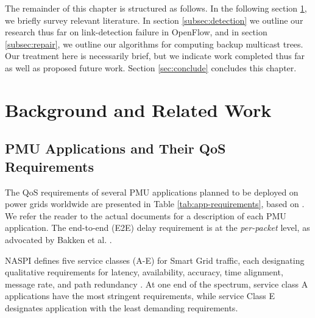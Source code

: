 The remainder of this chapter is structured as follows.  In the following section \ref{sec:related-work}, we briefly survey relevant literature.  In section \ref{subsec:detection} we outline our research thus far on link-detection failure in OpenFlow, 
and in section \ref{subsec:repair}, we outline our algorithms for computing backup multicast trees. Our treatment here is necessarily brief, but we indicate work completed thus far as well as proposed future work.  
Section \ref{sec:conclude} concludes this chapter.
















\section{Background and Related Work}
\label{sec:related-work}

\subsection{PMU Applications and Their QoS Requirements} 
\label{subsec:pmu-requirements}

The QoS requirements of several PMU applications planned to be deployed on power grids worldwide are presented in Table \ref{tab:app-requirements}, based on \cite{Bakken11,Kth09}.
We refer the reader to the actual documents for a description of each PMU application.  The end-to-end (E2E) delay requirement is at the \emph{per-packet} level, as advocated by
Bakken et al. \cite{Bakken11}.

NASPI defines five service classes (A-E) for Smart Grid traffic, each designating qualitative requirements for latency, availability, accuracy, time alignment, message rate, 
and path redundancy \cite{Bakken11}. At one end of the spectrum, service class A applications have the most stringent requirements, while service Class E designates application
with the least demanding requirements.

